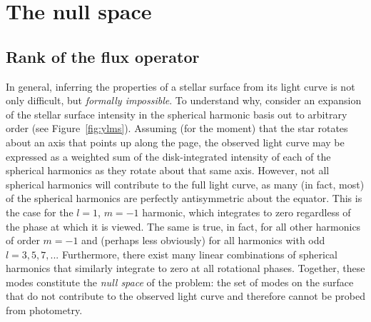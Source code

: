 \documentclass[modern]{aastex62}
\begin{document}



\section{The null space}
\label{sec:nullspace}

\subsection{Rank of the flux operator}
%
In general, inferring the properties of a stellar surface from its light curve is not
only difficult, but \emph{formally impossible}. To understand why, consider
an expansion of the stellar surface intensity in the spherical
harmonic basis out to arbitrary order (see Figure~\ref{fig:ylms}).
Assuming (for the moment) that the
star rotates about an axis that points up along the page, the observed
light curve may be expressed as a weighted sum of the disk-integrated intensity
of each of the spherical harmonics as they rotate about that same axis.
However, not all spherical harmonics will contribute to the full light curve,
as many (in fact, most) of the spherical harmonics are perfectly antisymmetric
about the equator. This is the case for
the $l = 1$, $m = -1$ harmonic, which integrates to zero regardless of
the phase at which it is viewed. The same is true, in fact, for all other harmonics
of order $m = -1$ and (perhaps less obviously) for all harmonics with odd
$l = 3, 5, 7, ...$ Furthermore, there exist many linear combinations of
spherical harmonics that similarly integrate to zero at all rotational
phases. Together, these modes constitute the \emph{null space} of the problem:
the set of modes on the surface that do not contribute to the observed
light curve and therefore cannot be probed from photometry.
\end{document}
